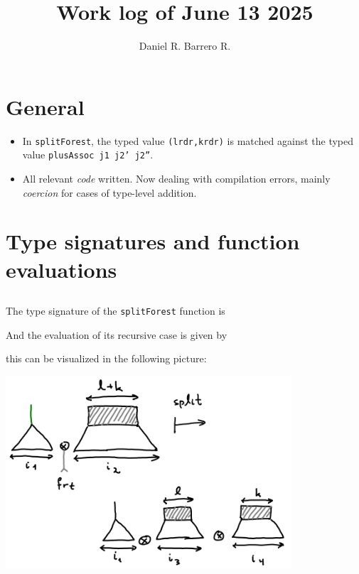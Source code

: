 \documentclass{amsart}
\title{Work log of June 13 2025}
\author{Daniel R. Barrero R.}
\begin{document}
\maketitle

\section{General}

\begin{itemize}
	\item In \texttt{splitForest}, the typed value \texttt{(lrdr,krdr)} is
		matched against the typed value \texttt{plusAssoc j1 j2' j2''}.
	\item All relevant \emph{code} written. Now dealing with compilation
		errors, mainly \emph{coercion} for cases of type-level
		 addition.
\end{itemize}

\newpage

\section{Type signatures and function evaluations}

\bigskip
\bigskip

\subsection{}

The type signature of the \texttt{splitForest} function is



\bigskip
\bigskip

And the evaluation of its recursive case is given by



\bigskip
\bigskip

this can be visualized in the following picture:

\bigskip
\bigskip

\includegraphics[width=0.8\textwidth]{forestSplit.png}
\end{document}
